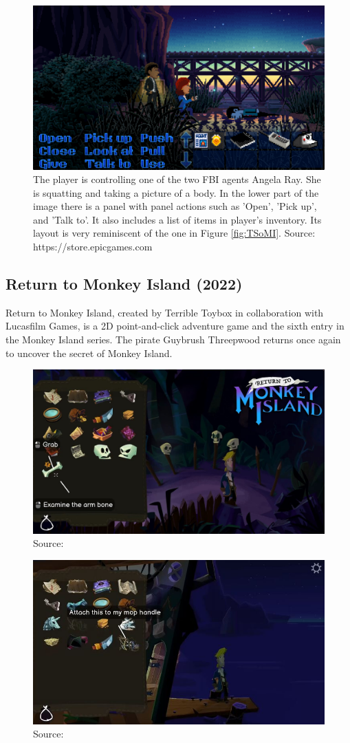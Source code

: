 
\begin{figure}[H]
\centering
\includegraphics[width=1.\linewidth]{img/TWP.png}
\caption{The player is controlling one of the two FBI agents Angela Ray. She is squatting and taking a picture of a body. In the lower part of the image there is a panel with panel actions such as 'Open', 'Pick up', and 'Talk to'. It also includes a list of items in player's inventory. Its layout is very reminiscent of the one in Figure \ref{fig:TSoMI}. Source: https://store.epicgames.com \cite{epic:TWP}}
\label{fig:TWP}
\end{figure}



\subsection{Return to Monkey Island (2022)}
Return to Monkey Island, created by Terrible Toybox in collaboration with Lucasfilm Games, is a 2D point-and-click adventure game and the sixth entry in the Monkey Island series. The pirate Guybrush Threepwood returns once again to uncover the secret of Monkey Island\cite{McCaffrey2022}.


\begin{figure}[H]
\centering
\includegraphics[width=.7\linewidth]{img/RtMI1.png}
\caption{Source:  \cite{}}
\label{fig:RtMI1}
\end{figure}

\begin{figure}[H]
\centering
\includegraphics[width=.7\linewidth]{img/RtMI2.png}
\caption{Source:  \cite{}}
\label{fig:RtMI2}
\end{figure}

